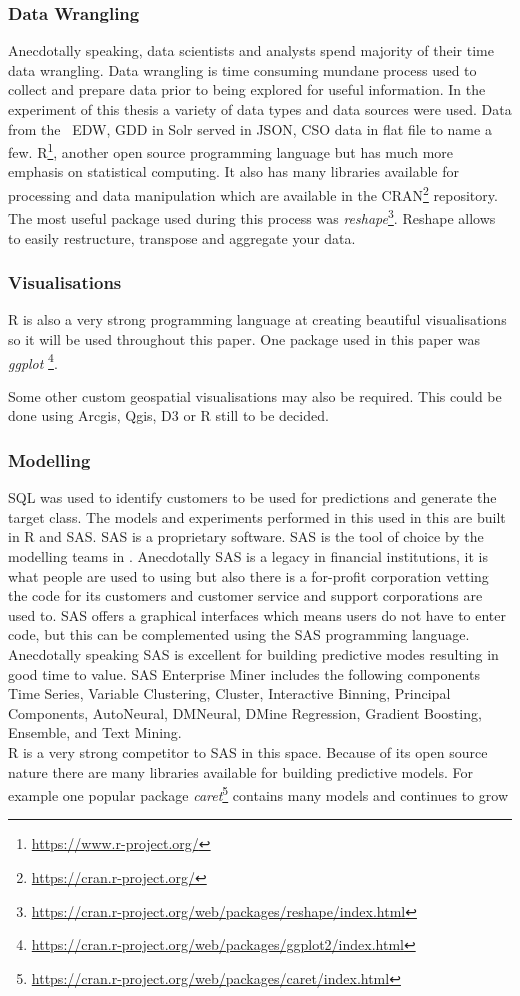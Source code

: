 \subsubsection{Data Wrangling}
Anecdotally speaking, data scientists and analysts spend majority of their time data wrangling. Data wrangling is time consuming mundane process used to collect and prepare data prior to being explored for useful information. In the experiment of this thesis a variety of data types and data sources were used. Data from the \subjectname\ EDW, GDD in Solr served in JSON, CSO data in flat file to name a few. R\footnote{{\url{https://www.r-project.org/}}}, another open source programming language but has much more emphasis on statistical computing. It also has many libraries available for processing and data manipulation which are available in the CRAN\footnote{{\url{https://cran.r-project.org/}}} repository. The most useful package used during this process was \textit{reshape}\footnote{{\url{https://cran.r-project.org/web/packages/reshape/index.html}}}. Reshape allows to easily restructure, transpose and aggregate your data. 

\subsubsection{Visualisations}
R is also a very strong programming language at creating beautiful visualisations so it will be used throughout this paper. One package used in this paper was \textit{ggplot}
\footnote{{\url{https://cran.r-project.org/web/packages/ggplot2/index.html}}}. 

Some other custom geospatial visualisations may also be required. This could be done using Arcgis, Qgis, D3 or R still to be decided.

\subsubsection{Modelling}
SQL was used to identify customers to be used for predictions and generate the target class.
The models and experiments performed in this used in this are built in R and SAS. SAS is a proprietary software. SAS is the tool of choice by the modelling teams in \subjectname. Anecdotally SAS is a legacy in financial institutions, it is what people are used to using but also there is a for-profit corporation vetting the code for its customers and customer service and support corporations are used to. SAS offers a graphical interfaces which means users do not have to enter code, but this can be complemented using the SAS programming language. Anecdotally speaking SAS is excellent for building predictive modes resulting in good time to value. SAS Enterprise Miner includes the following components Time Series, Variable Clustering, Cluster, Interactive Binning, Principal Components, AutoNeural, DMNeural, DMine Regression, Gradient Boosting, Ensemble, and Text Mining.
\\
R is a very strong competitor to SAS in this space. Because of its open source nature there are many libraries available for building predictive models. For example one popular package \textit{caret}\footnote{{\url{https://cran.r-project.org/web/packages/caret/index.html}}} contains many models and continues to grow

